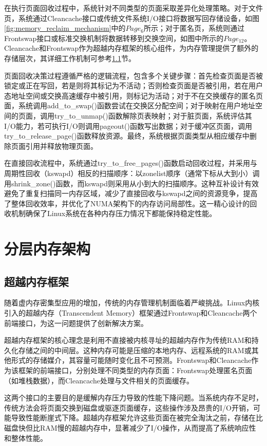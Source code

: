 在执行页面回收过程中，系统针对不同类型的页面采取差异化处理策略。对于文件页，系统通过Cleancache接口或传统文件系统I/O接口将数据写回存储设备，如图\ref{fig:memory_reclaim_mechanism}中的$Page_{6}$所示；对于匿名页，系统则通过Frontswap接口或标准交换机制将数据转移到交换空间，如图中所示的$Page_{12}$。Cleancache和Frontswap作为超越内存框架的核心组件，为内存管理提供了额外的存储层次，其详细工作机制可参考\ref{sec:超越内存框架}节。

页面回收决策过程遵循严格的逻辑流程，包含多个关键步骤：首先检查页面是否被锁定或正在写回，若是则将其标记为不活动；否则检查页面是否被引用，若在用户态地址空间或交换高速缓存中被引用，则标记为活动；对于不在交换缓存的匿名页面，系统调用add\_to\_swap()函数尝试在交换区分配空间；对于映射在用户地址空间的页面，调用try\_to\_unmap()函数解除页表映射；对于脏页面，系统评估其I/O能力，若可执行I/O则调用pageout()函数写出数据；对于缓冲区页面，调用try\_to\_release\_page()函数释放资源。最终，系统根据页面类型从相应缓存中删除页面引用并释放物理页面。

在直接回收流程中，系统通过try\_to\_free\_pages()函数启动回收过程，并采用与周期性回收（kswapd）相反的扫描顺序：以zonelist顺序（通常下标从大到小）调用shrink\_zone()函数，而kswapd则采用从小到大的扫描顺序。这种互补设计有效避免了重复扫描同一内存区域，减少了直接回收与kswapd之间的资源竞争，提高了整体回收效率，并优化了NUMA架构下的内存访问局部性。这一精心设计的回收机制确保了Linux系统在各种内存压力情况下都能保持稳定性能。

\section{分层内存架构}

\subsection{超越内存框架}
\label{sec:超越内存框架}
随着虚内存密集型应用的增加，传统的内存管理机制面临着严峻挑战。Linux内核引入的超越内存（Transcendent Memory）框架通过Frontswap和Cleancache两个前端接口，为这一问题提供了创新解决方案。

超越内存框架的核心理念是利用不直接被内核寻址的超越内存作为传统RAM和持久化存储之间的中间层。这种内存可能是压缩的本地内存、远程系统的RAM或其他形式的存储媒介，其容量可能随时变化且不可预测。Frontswap和Cleancache作为该框架的前端接口，分别处理不同类型的内存页面：Frontswap处理匿名页面（如堆栈数据），而Cleancache处理与文件相关的页面缓存。

这两个接口的主要目的是缓解内存压力导致的性能下降问题。当系统内存不足时，传统方法会将页面交换到磁盘或驱逐页面缓存，这些操作涉及昂贵的I/O开销，可能导致性能断崖式下降。超越内存框架允许这些页面在被完全淘汰之前，存储在比磁盘快但比RAM慢的超越内存中，显著减少了I/O操作，从而提高了系统响应性和整体性能。

